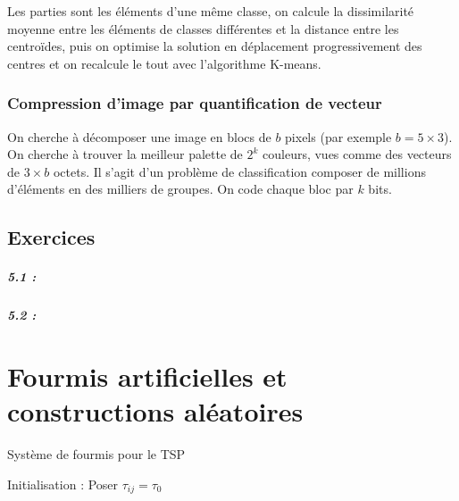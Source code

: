 \documentclass[11pt,a4paper]{report}
\begin{document}
Les parties sont les éléments d'une même classe, on calcule la dissimilarité moyenne entre les éléments de classes différentes et la distance entre les centroïdes, puis on optimise la solution en déplacement progressivement des centres et on recalcule le tout avec l'algorithme K-means.

\subsection{Compression d'image par quantification de vecteur}

On cherche à décomposer une image en blocs de $b$ pixels (par exemple $b=5 \times 3$). On cherche à trouver la meilleur palette de $2^k$ couleurs, vues comme des vecteurs de $3 \times b$ octets. Il s'agit d'un problème de classification composer de millions d'éléments en des milliers de groupes. On code chaque bloc par $k$ bits.

\section{Exercices}

\paragraph*{5.1 : } 

\paragraph*{5.2 : } 

\chapter{Fourmis artificielles et constructions aléatoires}

\begin{algorithm}[H]
\caption{Système de fourmis pour le TSP}
Initialisation : Poser $\tau_{ij} = \tau_0$\;
\end{algorithm}
\end{document}
